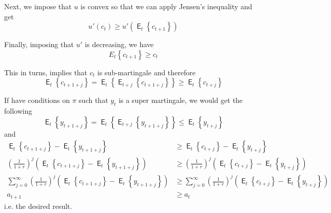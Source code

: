 \documentclass[12pt]{article}
\newcommand{\1}{{\bf 1}} %
\DeclareMathOperator{\E}{\mathsf{E}} %
\newcommand{\cbra}[1]{\left\{ #1 \right\}}
\begin{document}
\begin{enumerate}[(1)]
	Next, we impose that $u$ is convex so that we can apply Jensen's inequality and get
			\[
	u'(c_t) \geq u'( \E_t\cbra{c_{t+1}})
	\]
	
	Finally, imposing that $u'$ is decreasing, we have 
				\[
	E_t\cbra{c_{t+1}} \geq c_t
	\]
	
	This in turns, implies that $c_t$ is sub-martingale and therefore
	\[
	\E_t\cbra{c_{t+1+j}} = \E_t\cbra{\E_{t+j}\cbra{c_{t+1+j}}} \geq \E_t\cbra{c_{t+j}}
	\]
	
	If have conditions on $\pi$ such that $y_t$ is a super martingale, we would get the following 
		\[
	\E_t\cbra{y_{t+1+j}} = \E_t\cbra{\E_{t+j}\cbra{y_{t+1+j}}} \leq \E_t\cbra{y_{t+j}}
	\]
	and
	\begin{align*}
	\E_t\cbra{c_{t+1+j}}-\E_t\cbra{y_{t+1+j}} &\geq \E_t\cbra{c_{t+j}}-\E_t\cbra{y_{t+j}}\\
		 \left( \frac{1}{1+r}\right)^j\left( \E_t\cbra{c_{t+1+j}}-\E_t\cbra{y_{t+1+j}}\right)  &\geq   \left( \frac{1}{1+r}\right)^j\left( \E_t\cbra{c_{t+j}}-\E_t\cbra{y_{t+j}} \right) \\
	 \sum_{j=0}^{\infty}\left( \frac{1}{1+r}\right)^j\left( \E_t\cbra{c_{t+1+j}}-\E_t\cbra{y_{t+1+j}}\right)  &\geq   \sum_{j=0}^{\infty}\left( \frac{1}{1+r}\right)^j\left( \E_t\cbra{c_{t+j}}-\E_t\cbra{y_{t+j}} \right) \\
	 a_{t+1} &\geq a_t
	\end{align*}
	i.e. the desired result.
	
\end{enumerate}
\end{document}
